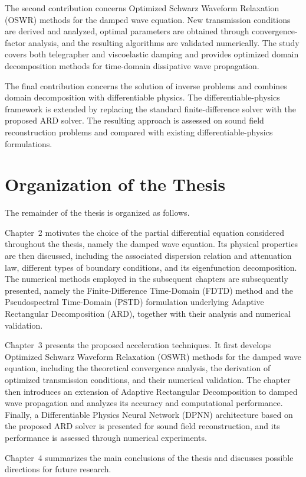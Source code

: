 \documentclass{Configuration_Files/PoliMi3i_thesis}
\begin{document}
The second contribution concerns Optimized Schwarz Waveform Relaxation (OSWR) methods for the damped wave equation. New transmission conditions are derived and analyzed, optimal parameters are obtained through convergence-factor analysis, and the resulting algorithms are validated numerically. The study covers both telegrapher and viscoelastic damping and provides optimized domain decomposition methods for time-domain dissipative wave propagation.

The final contribution concerns the solution of inverse problems and combines domain decomposition with differentiable physics. The differentiable-physics framework is extended by replacing the standard finite-difference solver with the proposed ARD solver. The resulting approach is assessed on sound field reconstruction problems and compared with existing differentiable-physics formulations.
%
\section{Organization of the Thesis}
The remainder of the thesis is organized as follows.

Chapter~2 motivates the choice of the partial differential equation considered throughout the thesis, namely the damped wave equation. Its physical properties are then discussed, including the associated dispersion relation and attenuation law, different types of boundary conditions, and its eigenfunction decomposition. The numerical methods employed in the subsequent chapters are subsequently presented, namely the Finite-Difference Time-Domain (FDTD) method and the Pseudospectral Time-Domain (PSTD) formulation underlying Adaptive Rectangular Decomposition (ARD), together with their analysis and numerical validation.

Chapter~3 presents the proposed acceleration techniques. It first develops Optimized Schwarz Waveform Relaxation (OSWR) methods for the damped wave equation, including the theoretical convergence analysis, the derivation of optimized transmission conditions, and their numerical validation. The chapter then introduces an extension of Adaptive Rectangular Decomposition to damped wave propagation and analyzes its accuracy and computational performance. Finally, a Differentiable Physics Neural Network (DPNN) architecture based on the proposed ARD solver is presented for sound field reconstruction, and its performance is assessed through numerical experiments.

Chapter~4 summarizes the main conclusions of the thesis and discusses possible directions for future research.
\end{document}
